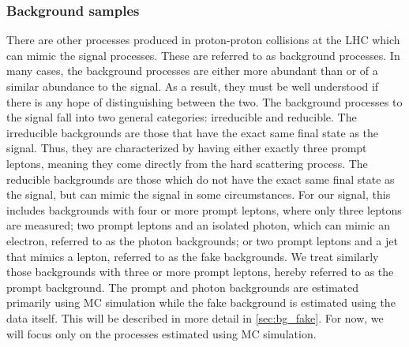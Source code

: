 \subsubsection{Background samples}
\label{sec:www_bg_samples}

There are other processes produced in proton-proton collisions at the LHC
which can mimic the signal processes. These are referred to as background processes.
In many cases, the background processes are either
more abundant than or of a similar abundance to
the signal. As a result, they must be well understood if there is any hope
of distinguishing between the two. The background processes to the signal
fall into two general categories: irreducible and reducible. 
The irreducible backgrounds are those that have the exact same final
state as the signal. Thus, they 
are characterized by having either exactly three prompt leptons, meaning they
come directly from the hard scattering process.
The reducible backgrounds are those which do not have the exact same
final state as the signal, but can mimic the signal in some circumstances.
For our signal, this includes backgrounds with four or more prompt leptons,
where only three leptons are measured;
two prompt leptons and an isolated photon, which can mimic an electron,
referred to as the photon backgrounds;
or two prompt leptons and a jet that mimics a lepton, referred to as
the fake backgrounds.
We treat similarly those backgrounds with three or more prompt leptons,
hereby referred to as the prompt background.
The prompt and photon backgrounds 
are estimated primarily using MC simulation while the fake background
is estimated using the data itself. 
This will be described in more detail in \sec\ref{sec:bg_fake}.
For now, we will focus only on the processes estimated using MC simulation.

